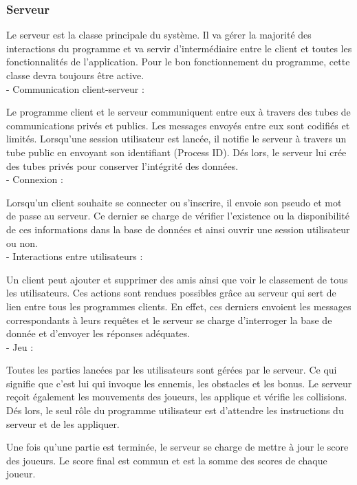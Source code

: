 \documentclass[a4paper,12pt]{article}
\begin{document}
\subsubsection{Serveur}
Le serveur est la classe principale du système. Il va gérer la majorité des interactions du programme et va servir d'intermédiaire entre le client et toutes les fonctionnalités de l'application. Pour le bon fonctionnement du programme, cette classe devra toujours être active.\\

- Communication client-serveur :

Le programme client et le serveur communiquent entre eux à travers des tubes de communications privés et publics. Les messages envoyés entre eux sont codifiés et limités.
Lorsqu'une session utilisateur est lancée, il notifie le serveur à travers un tube public en envoyant son identifiant (Process ID). 
Dés lors, le serveur lui crée des tubes privés pour conserver l'intégrité des données.\\

- Connexion :

Lorsqu'un client souhaite se connecter ou s'inscrire, il envoie son pseudo et mot de passe au serveur. Ce dernier se charge de vérifier l'existence ou la disponibilité de ces informations dans la base de données et ainsi ouvrir une session utilisateur ou non.\\

- Interactions entre utilisateurs :

Un client peut ajouter et supprimer des amis ainsi que voir le classement de tous les utilisateurs. 
Ces actions sont rendues possibles grâce au serveur qui sert de lien entre tous les programmes clients. 
En effet, ces derniers envoient les messages correspondants à leurs requêtes et le serveur se charge d'interroger la base de donnée et d'envoyer les réponses adéquates. \\

- Jeu :

Toutes les parties lancées par les utilisateurs sont gérées par le serveur. Ce qui signifie que c'est lui qui invoque les ennemis, les obstacles et les bonus. Le serveur reçoit également les mouvements des joueurs, les applique et vérifie les collisions.
Dés lors, le seul rôle du programme utilisateur est d'attendre les instructions du serveur et de les appliquer. 

Une fois qu'une partie est terminée, le serveur se charge de mettre à jour le score des joueurs. Le score final est commun et est la somme des scores de chaque joueur.
\end{document}
